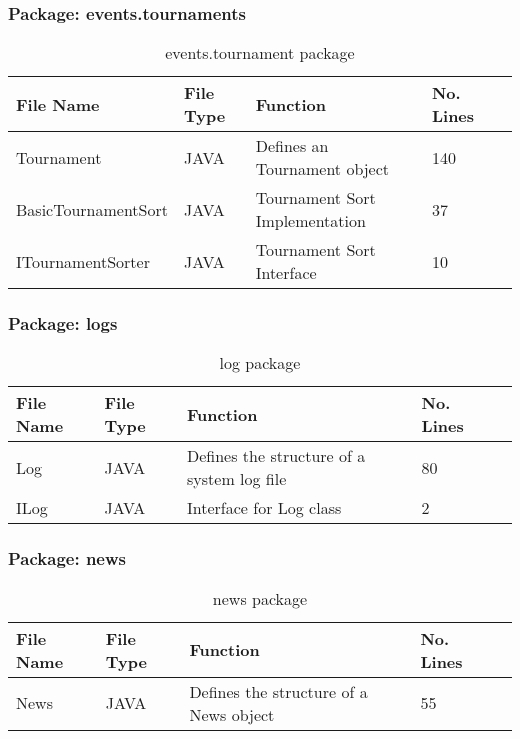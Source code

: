 \subsubsection{Package: events.tournaments}
\begin{table}[H]
\begin{center}
     \begin{tabular}{| l | l | l| l |p{1cm} |}
    \hline
    File Name & File Type & Function & No. Lines\\ \hline
    Tournament & JAVA & Defines an Tournament object & 140\\ \hline
	BasicTournamentSort & JAVA & Tournament Sort Implementation & 37\\ \hline
	ITournamentSorter & JAVA & Tournament Sort Interface & 10\\ \hline
    \end{tabular}
\end{center}
\caption{events.tournament package}
\end{table}

\subsubsection{Package: logs}
\begin{table}[H]
\begin{center}
    \begin{tabular}{| l | l | l| l |p{1cm} |}
    \hline
    File Name & File Type & Function & No. Lines\\ \hline
    Log & JAVA & Defines the structure of a system log file & 80\\ \hline
	ILog & JAVA & Interface for Log class & 2\\ \hline
    \end{tabular}
\end{center}
\caption{log package}
\end{table}

\subsubsection{Package: news}
\begin{table}[H]
\begin{center}
     \begin{tabular}{| l | l | l| l |p{1cm} |}
    \hline
    File Name & File Type & Function & No. Lines\\ \hline
    News & JAVA & Defines the structure of a News object & 55\\ \hline
    \end{tabular}
\end{center}
\caption{news package}
\end{table}

